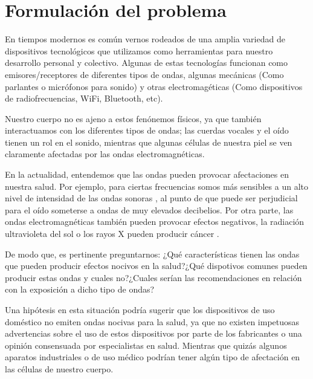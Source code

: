 \documentclass[spanish,notitlepage,letterpaper, 12pt]{article}
\begin{document}

\tableofcontents

\newpage

\section{Formulación del problema}
En tiempos modernos es común vernos rodeados de una amplia variedad de dispositivos tecnológicos que utilizamos como herramientas para nuestro desarrollo personal y colectivo. Algunas de estas tecnologías funcionan como emisores/receptores de diferentes tipos de ondas, algunas mecánicas (Como
parlantes o micrófonos para sonido) y otras
electromagéticas (Como dispositivos de radiofrecuencias, WiFi, Bluetooth, etc).\par
\bigskip
Nuestro cuerpo no es ajeno a estos fenónemos físicos, ya que también interactuamos con los diferentes tipos de ondas; las cuerdas vocales y el oído tienen un rol en el sonido, mientras que algunas células de nuestra piel se ven claramente afectadas por las ondas electromagnéticas. \cite{IDEAM}\par
\bigskip
En la actualidad, entendemos que las ondas pueden provocar afectaciones en nuestra salud.  Por ejemplo, para ciertas frecuencias somos más sensibles a un alto nivel de intensidad de las ondas sonoras \cite{serway_jewett_2017}, al punto de que puede ser perjudicial para el oído someterse a ondas de
muy elevados decibelios. Por otra parte, las ondas electromagnéticas también pueden provocar efectos negativos, la radiación ultravioleta del sol o los rayos X pueden producir cáncer \cite{Wall2006-pi}.\par
\bigskip
De modo que, es pertinente preguntarnos: ¿Qué características tienen las ondas que pueden producir efectos nocivos en la salud?¿Qué dispotivos comunes pueden producir estas ondas y cuales no?¿Cuales serían las recomendaciones en relación con la exposición a dicho tipo de ondas?\par
\bigskip
Una hipótesis en esta situación podría sugerir que los dispositivos de uso doméstico no emiten ondas nocivas para la salud, ya que no existen impetuosas advertencias sobre el uso de estos dispositivos por parte de los fabricantes o una opinión consensuada por especialistas en salud. Mientras que
quizás algunos aparatos industriales o de uso médico podrían tener algún tipo de afectación en las células de nuestro cuerpo.
\end{document}

